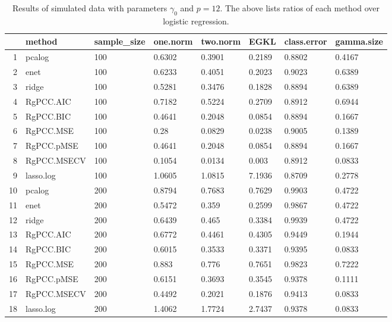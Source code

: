 \begin{table}[ht]
\centering
\begin{tabular}{rlllllll}
  \hline
 & method & sample\_size & one.norm & two.norm & EGKL & class.error & gamma.size \\ 
  \hline
1 & pcalog & 100 & 0.6302 & 0.3901 & 0.2189 & 0.8802 & 0.4167 \\ 
  2 & enet & 100 & 0.6233 & 0.4051 & 0.2023 & 0.9023 & 0.6389 \\ 
  3 & ridge & 100 & 0.5281 & 0.3476 & 0.1828 & 0.8894 & 0.6389 \\ 
  4 & RgPCC.AIC & 100 & 0.7182 & 0.5224 & 0.2709 & 0.8912 & 0.6944 \\ 
  5 & RgPCC.BIC & 100 & 0.4641 & 0.2048 & 0.0854 & 0.8894 & 0.1667 \\ 
  6 & RgPCC.MSE & 100 & 0.28 & 0.0829 & 0.0238 & 0.9005 & 0.1389 \\ 
  7 & RgPCC.pMSE & 100 & 0.4641 & 0.2048 & 0.0854 & 0.8894 & 0.1667 \\ 
  8 & RgPCC.MSECV & 100 & 0.1054 & 0.0134 & 0.003 & 0.8912 & 0.0833 \\ 
  9 & lasso.log & 100 & 1.0605 & 1.0815 & 7.1936 & 0.8709 & 0.2778 \\ 
  10 & pcalog & 200 & 0.8794 & 0.7683 & 0.7629 & 0.9903 & 0.4722 \\ 
  11 & enet & 200 & 0.5472 & 0.359 & 0.2599 & 0.9867 & 0.4722 \\ 
  12 & ridge & 200 & 0.6439 & 0.465 & 0.3384 & 0.9939 & 0.4722 \\ 
  13 & RgPCC.AIC & 200 & 0.6772 & 0.4461 & 0.4305 & 0.9449 & 0.1944 \\ 
  14 & RgPCC.BIC & 200 & 0.6015 & 0.3533 & 0.3371 & 0.9395 & 0.0833 \\ 
  15 & RgPCC.MSE & 200 & 0.883 & 0.776 & 0.7651 & 0.9823 & 0.7222 \\ 
  16 & RgPCC.pMSE & 200 & 0.6151 & 0.3693 & 0.3545 & 0.9378 & 0.1111 \\ 
  17 & RgPCC.MSECV & 200 & 0.4492 & 0.2021 & 0.1876 & 0.9413 & 0.0833 \\ 
  18 & lasso.log & 200 & 1.4062 & 1.7724 & 2.7437 & 0.9378 & 0.0833 \\ 
   \hline
\end{tabular}
\caption{Results of simulated data with parameters $\gamma_0$ and $p =12$. The above lists ratios of each method over logistic regression.} 
\label{fig-0-debug-new-algo-12-metrics-pratio}
\end{table}
